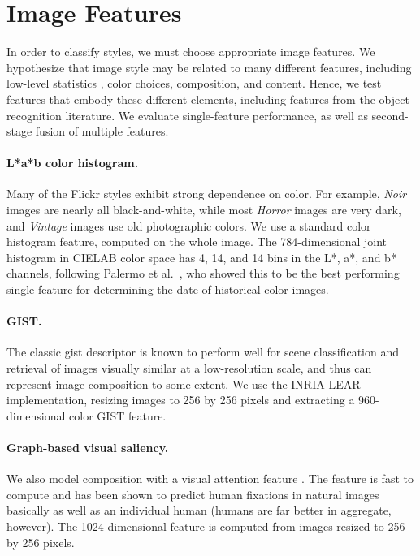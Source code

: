 
\section{Image Features}

In order to classify styles, we must choose appropriate image features.  We hypothesize that image style may be related to many different features, including low-level statistics \cite{Lyu-PNAS-2004}, color choices, composition, and content.  Hence, we test features that embody these different elements, including features from the object recognition literature.
We evaluate single-feature performance, as well as second-stage fusion of multiple features.

\vspace{-0.5em}
\paragraph{L*a*b color histogram.}
Many of the Flickr styles exhibit strong dependence on color. For example, \emph{Noir} images are nearly all black-and-white, while most \emph{Horror} images are very dark, and \emph{Vintage} images use old photographic colors. We use a standard color histogram feature, computed on the whole image.
The 784-dimensional joint histogram in CIELAB color space has 4, 14, and 14 bins in the L*, a*, and b* channels, following Palermo et al.~\cite{Palermo-ECCV-2012}, who showed this to be the best performing single feature for determining the date of historical color images.

\vspace{-0.5em}
\paragraph{GIST.}
The classic gist descriptor \cite{Oliva-IJCV-2001} is known to perform well for scene classification and retrieval of images visually similar at a low-resolution scale, and thus can represent image composition to some extent.
We use the INRIA LEAR implementation, resizing images to 256 by 256 pixels and extracting a 960-dimensional color GIST feature.

\vspace{-0.5em}
\paragraph{Graph-based visual saliency.}
We also model composition with a visual attention feature \cite{Harel-NIPS-2006}.
The feature is fast to compute and has been shown to predict human fixations in natural images basically as well as an individual human (humans are far better in aggregate, however).
The 1024-dimensional feature is computed from images resized to 256 by 256 pixels.

